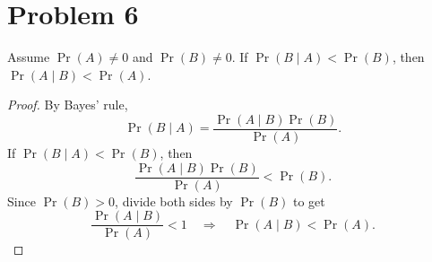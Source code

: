 \section*{Problem 6}

Assume $\Pr(A)\neq 0$ and $\Pr(B)\neq 0$. If $\Pr(B\mid A)<\Pr(B)$, then $\Pr(A\mid B)<\Pr(A)$.

\begin{proof}
By Bayes' rule,
\[
\Pr(B\mid A)=\frac{\Pr(A\mid B)\Pr(B)}{\Pr(A)}.
\]
If $\Pr(B\mid A)<\Pr(B)$, then
\[
\frac{\Pr(A\mid B)\Pr(B)}{\Pr(A)}<\Pr(B).
\]
Since $\Pr(B)>0$, divide both sides by $\Pr(B)$ to get
\[
\frac{\Pr(A\mid B)}{\Pr(A)}<1
\quad\Longrightarrow\quad
\Pr(A\mid B)<\Pr(A).
\]
\end{proof}
